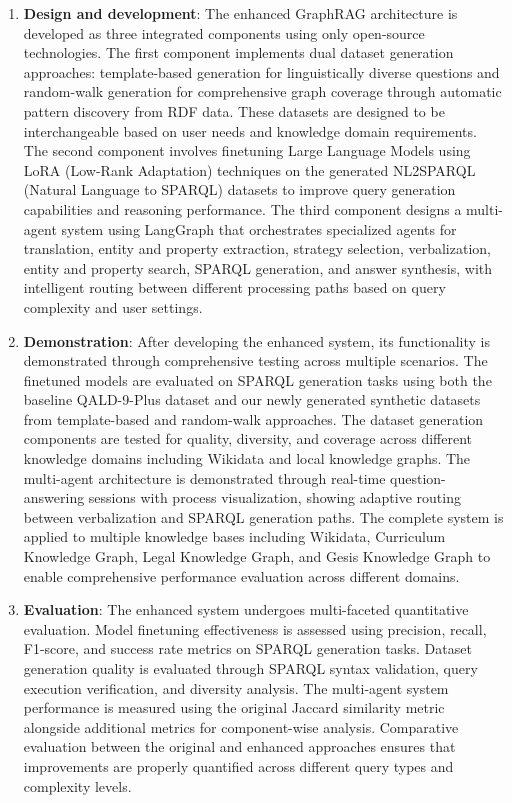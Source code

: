 \begin{enumerate}
    \item \textbf{Design and development}: The enhanced GraphRAG architecture is developed as three integrated components using only open-source technologies. The first component implements dual dataset generation approaches: template-based generation for linguistically diverse questions and random-walk generation for comprehensive graph coverage through automatic pattern discovery from RDF data. These datasets are designed to be interchangeable based on user needs and knowledge domain requirements. The second component involves finetuning Large Language Models using LoRA (Low-Rank Adaptation) techniques on the generated NL2SPARQL (Natural Language to SPARQL) datasets to improve query generation capabilities and reasoning performance. The third component designs a multi-agent system using LangGraph that orchestrates specialized agents for translation, entity and property extraction, strategy selection, verbalization, entity and property search, SPARQL generation, and answer synthesis, with intelligent routing between different processing paths based on query complexity and user settings.
    \item \textbf{Demonstration}: After developing the enhanced system, its functionality is demonstrated through comprehensive testing across multiple scenarios. The finetuned models are evaluated on SPARQL generation tasks using both the baseline QALD-9-Plus dataset and our newly generated synthetic datasets from template-based and random-walk approaches. The dataset generation components are tested for quality, diversity, and coverage across different knowledge domains including Wikidata and local knowledge graphs. The multi-agent architecture is demonstrated through real-time question-answering sessions with process visualization, showing adaptive routing between verbalization and SPARQL generation paths. The complete system is applied to multiple knowledge bases including Wikidata, Curriculum Knowledge Graph, Legal Knowledge Graph, and Gesis Knowledge Graph to enable comprehensive performance evaluation across different domains.
    \item \textbf{Evaluation}: The enhanced system undergoes multi-faceted quantitative evaluation. Model finetuning effectiveness is assessed using precision, recall, F1-score, and success rate metrics on SPARQL generation tasks. Dataset generation quality is evaluated through SPARQL syntax validation, query execution verification, and diversity analysis. The multi-agent system performance is measured using the original Jaccard similarity metric alongside additional metrics for component-wise analysis. Comparative evaluation between the original and enhanced approaches ensures that improvements are properly quantified across different query types and complexity levels.

\end{enumerate}
